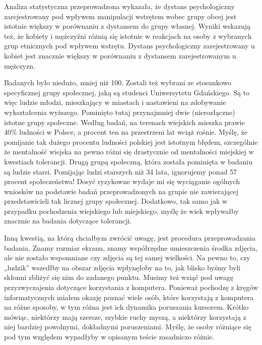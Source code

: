 \documentclass{psychol}
\begin{document}
Analiza statystyczna przeprowadzona wykazała, że dystans psychologiczny zarejestrowany pod wpływem manipulacji
wstrętem wobec grupy obcej jest istotnie większy w porównaniu z dystansem do grupy \costam[123][zzzzzzz] \costam[321][zzzzzzz]
własnej. Wyniki wskazują też, że kobiety i mężczyźni różnią się istotnie w reakcjach na osoby z wybranych grup etnicznych pod wpływem wstrętu. Dystans psychologiczny zarejestrowany u kobiet jest znacznie większy w porównaniu z dystansem zarejestrowanym
u mężczyzn.


Badanych było niedużo, mniej niż 100. Zostali też wybrani ze stosunkowo specyficznej grupy społecznej, jaką są studenci Uniwersytetu Gdańskiego. Są to więc ludzie młodzi, mieszkający w miastach i nastawieni na zdobywanie wykształcenia wyższego. Pominięto tutaj przynajmniej dwie (nierozłączne) istotne grupy społeczne. Według badań, na terenach wiejskich mieszka prawie 40\% ludności w Polsce, a procent ten na przestrzeni lat wciąż rośnie. Myślę, że pomijanie tak dużego procentu ludności polskiej jest istotnym błędem, szczególnie że mentalność wiejska na pewno różni się drastycznie od mentalności miejskiej w kwestiach tolerancji. Drugą grupą społeczną, która została pominięta w badaniu są ludzie starsi. Pomijając ludzi starszych niż 34 lata, ignorujemy ponad 57 procent społeczeństwa! Dosyć ryzykowne wydaje mi się wyciąganie ogólnych wniosków na podstawie badań przeprowadzonych na grupie nie zawierającej przedstawicieli tak licznej grupy społecznej. Dodatkowo, tak samo jak w przypadku pochodzenia wiejskiego lub miejskiego, myślę że wiek wpływałby znacznie na badania dotyczące tolerancji.

Inną kwestią, na którą chciałbym zwrócić uwagę, jest procedura przeprowadzania badania. Znamy rozmiar ekranu, znamy współrzędne umieszczenia środka zdjęcia, ale nie zostało wspomniane czy zdjęcia są tej samej wielkości. Na pewno to, czy „ludzik” wszedłby na obszar zdjęcia wpłynęłoby na to, jak blisko byśmy byli skłonni zbliżyć się nim do zadanego punktu. Musimy też wziąć pod uwagę przyzwyczajenia dotyczące korzystania z komputera. Ponieważ pochodzę z kręgów informatycznych miałem okazję poznać wiele osób, które korzystają z komputera na różne sposoby, w tym różna jest ich dynamika poruszania kursorem. Krótko mówiąc, niektórzy mają szersze, szybkie ruchy myszą, a niektórzy korzystają z niej bardziej powolnymi, dokładnymi poruszeniami. Myślę, że osoby różniące się pod tym względem wypadłyby w opisanym teście zasadniczo różnie.
\end{document}
